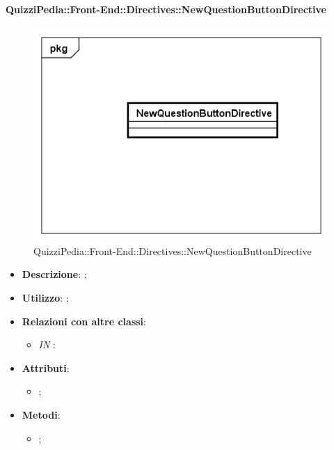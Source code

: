 \paragraph{QuizziPedia::Front-End::Directives::NewQuestionButtonDirective}

\label{QuizziPedia::Front-End::Directives::NewQuestionButtonDirective}

\begin{figure}[h]
	\centering
	\includegraphics[scale=0.5,keepaspectratio]{UML/Classi/Front-End/QuizziPedia_Front-end_Directives_NewQuestionButtonDirective.png}
	\caption{QuizziPedia::Front-End::Directives::NewQuestionButtonDirective}
\end{figure}

\begin{itemize}
	\item \textbf{Descrizione}: ;
	\item \textbf{Utilizzo}: ;
	\item \textbf{Relazioni con altre classi}: 
	\begin{itemize}
		\item \textit{IN} \texttt{}: 
	\end{itemize}
	\item \textbf{Attributi}: 
	\begin{itemize}
		\item ;
	\end{itemize}
	\item \textbf{Metodi}: 
	\begin{itemize}
		\item ;
	\end{itemize}
\end{itemize}

